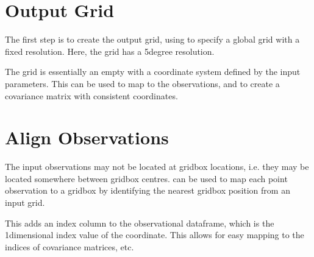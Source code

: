 \documentclass[letterpaper,10pt,english]{sphinxmanual}
\begin{document}
\section{Output Grid}
\label{\detokenize{workflow:output-grid}}
\sphinxAtStartPar
The first step is to create the output grid, using
{\hyperref[\detokenize{covariance:glomar_gridding.grid.grid_from_resolution}]{}} to specify a global grid with a fixed
resolution. Here, the grid has a 5\sphinxhyphen{}degree resolution.

\sphinxAtStartPar
The grid is essentially an empty  with a coordinate system defined by the input
parameters. This can be used to map to the observations, and to create a covariance matrix with
consistent coordinates.

\begin{sphinxVerbatim}[commandchars=\\\{\}]
  
    \PYG{p}{[}   \PYG{p}{]}
    \PYG{p}{[} \PYG{p}{]}
\end{sphinxVerbatim}


\section{Align Observations}
\label{\detokenize{workflow:align-observations}}
\sphinxAtStartPar
The input observations may not be located at grid\sphinxhyphen{}box locations, i.e. they may be located somewhere
between grid\sphinxhyphen{}box centres. {\hyperref[\detokenize{kriging:glomar_gridding.grid.map_to_grid}]{}} can be used to map each point
observation to a grid\sphinxhyphen{}box by identifying the nearest grid\sphinxhyphen{}box position from an input grid.

\sphinxAtStartPar
This adds an index column to the observational data\sphinxhyphen{}frame, which is the 1\sphinxhyphen{}dimensional index value of
the coordinate. This allows for easy mapping to the indices of covariance matrices, etc.
\end{document}
